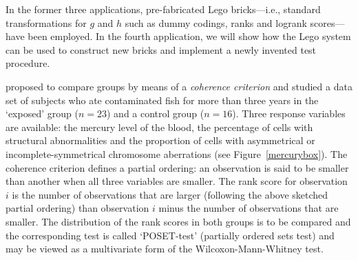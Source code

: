 \documentclass{article}
\begin{document}
In the former three applications, pre-fabricated Lego bricks---i.e.,
standard transformations for $g$ and $h$ such as dummy codings, ranks
and logrank scores---have been employed.
In the fourth application, we will show how the Lego system can be used
to construct new bricks and implement a newly invented test procedure. 

\cite{Rosenbaum1994a} proposed to compare groups by means of a
\textit{coherence criterion} and studied a data set of subjects 
who ate contaminated fish for more than three years in
the `exposed' group ($n = 23$) and a control group ($n = 16$). 
Three response variables are
available: the mercury level of the blood, the percentage of cells with
structural abnormalities and the proportion of cells with asymmetrical or
incomplete-symmetrical chromosome aberrations (see Figure~\ref{mercurybox}). 
The coherence criterion defines a partial ordering: 
an observation is said to be smaller than another when all three variables
are smaller. The rank score for observation $i$ is the number of
observations that are larger (following the above sketched partial ordering) 
than observation $i$ minus the number of
observations that are smaller. The
distribution of the rank scores in both groups is to be compared and
the corresponding test is called `POSET-test' (partially ordered
sets test) and may be viewed as a multivariate form of the
Wilcoxon-Mann-Whitney test.
\end{document}
